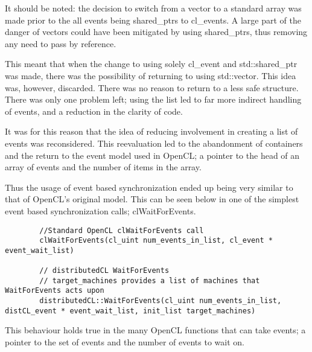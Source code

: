 \documentclass[report.tex]{subfiles}
\begin{document}
        It should be noted: the decision to switch from a vector to a standard array was made prior to the all events being shared\_ptrs to cl\_events. A large part of the danger of vectors could have been mitigated by using shared\_ptrs, thus removing any need to pass by reference.

        This meant that when the change to using solely cl\_event and std::shared\_ptr was made, there was the possibility of returning to using std::vector. This idea was, however, discarded. There was no reason to return to a less safe structure. There was only one problem left; using the list led to far more indirect handling of events, and a reduction in the clarity of code. 

        It was for this reason that the idea of reducing involvement in creating a list of events was reconsidered. This reevaluation led to the abandonment of containers and the return to the event model used in OpenCL; a pointer to the head of an array of events and the number of items in the array.

        Thus the usage of event based synchronization ended up being very similar to that of OpenCL's original model. This can be seen below in one of the simplest event based synchronization calls; clWaitForEvents.

        \begin{lstlisting}
        //Standard OpenCL clWaitForEvents call
        clWaitForEvents(cl_uint num_events_in_list, cl_event * event_wait_list)
        
        // distributedCL WaitForEvents
        // target_machines provides a list of machines that WaitForEvents acts upon
        distributedCL::WaitForEvents(cl_uint num_events_in_list, distCL_event * event_wait_list, init_list target_machines)
        \end{lstlisting}

        This behaviour holds true in the many OpenCL functions that can take events; a pointer to the set of events and the number of events to wait on.

\end{document}
